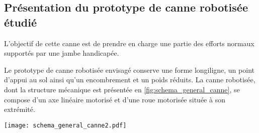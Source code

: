 \ifprof
\else
\begin{multicols}{2}
\fi





\subsection*{Présentation du prototype de canne robotisée étudié}
\ifprof
\else

L'objectif de cette canne est de prendre en charge une partie des efforts normaux supportés par une jambe handicapée.

Le prototype de canne robotisée envisagé conserve une forme longiligne, un point d'appui au sol ainsi qu'un encombrement et un poids réduits. La canne robotisée, dont la structure mécanique est présentée en \ref{fig:schema_general_canne}, se compose d'un axe linéaire motorisé et d'une roue motorisée située à son extrémité.


\begin{center}%
\texttt{[image: schema\_general\_canne2.pdf]}
\label{fig:schema_general_canne}
\end{center}



\end{multicols}
